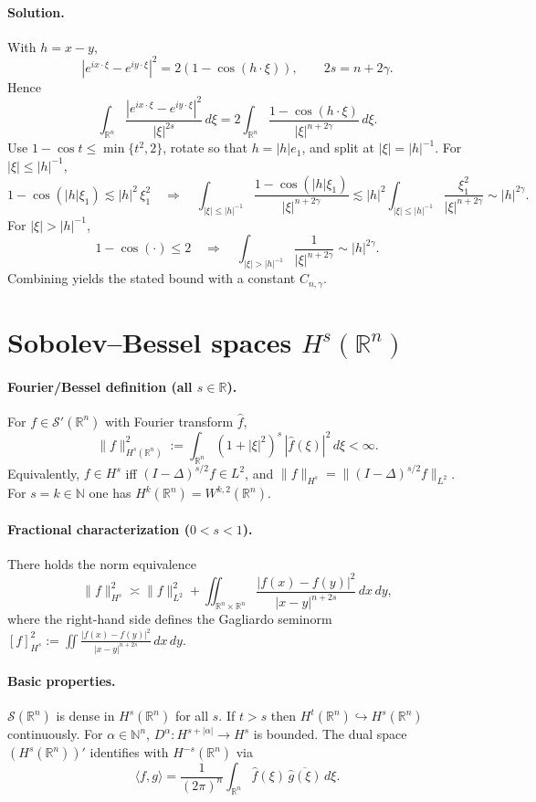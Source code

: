 \documentclass[12pt,a4paper]{article}
\theoremstyle{plain}
\theoremstyle{definition}
\theoremstyle{remark}
\theoremstyle{remark}
\begin{document}
\paragraph{Solution.}
With $h=x-y$,
\[
|e^{ix\cdot\xi}-e^{iy\cdot\xi}|^2=2(1-\cos(h\cdot\xi)),
\qquad
2s=n+2\gamma.
\]
Hence
\[
\int_{\mathbb R^n}\frac{|e^{ix\cdot\xi}-e^{iy\cdot\xi}|^2}{|\xi|^{2s}}\,d\xi
=2\!\int_{\mathbb R^n}\frac{1-\cos(h\cdot\xi)}{|\xi|^{n+2\gamma}}\,d\xi.
\]
Use $1-\cos t\le \min\{t^2,2\}$, rotate so that $h=|h|e_1$, and split at $|\xi|=|h|^{-1}$.
For $|\xi|\le |h|^{-1}$,
\[
1-\cos(|h|\xi_1)\lesssim |h|^2\,\xi_1^2
\quad\Rightarrow\quad
\int_{|\xi|\le |h|^{-1}}\frac{1-\cos(|h|\xi_1)}{|\xi|^{n+2\gamma}}
\lesssim |h|^2 \int_{|\xi|\le |h|^{-1}}\frac{\xi_1^2}{|\xi|^{n+2\gamma}}
\sim |h|^{2\gamma}.
\]
For $|\xi|>|h|^{-1}$,
\[
1-\cos(\cdot)\le 2
\quad\Rightarrow\quad
\int_{|\xi|>|h|^{-1}}\frac{1}{|\xi|^{n+2\gamma}}
\sim |h|^{2\gamma}.
\]
Combining yields the stated bound with a constant $C_{n,\gamma}$.

\section*{Sobolev--Bessel spaces $H^s(\mathbb R^n)$}

\paragraph{Fourier/Bessel definition (all $s\in\mathbb R$).}
For $f\in\mathcal S'(\mathbb R^n)$ with Fourier transform $\widehat f$,
\[
\|f\|_{H^s(\mathbb R^n)}^2 := \int_{\mathbb R^n} (1+|\xi|^2)^s\,|\widehat f(\xi)|^2\,d\xi < \infty.
\]
Equivalently, $f\in H^s$ iff $(I-\Delta)^{s/2}f\in L^2$, and
$\|f\|_{H^s}=\|(I-\Delta)^{s/2}f\|_{L^2}$.
For $s=k\in\mathbb N$ one has $H^k(\mathbb R^n)=W^{k,2}(\mathbb R^n)$.

\medskip

\paragraph{Fractional characterization ($0<s<1$).}
There holds the norm equivalence
\[
\|f\|_{H^s}^2 \asymp \|f\|_{L^2}^2
+ \iint_{\mathbb R^n\times\mathbb R^n} \frac{|f(x)-f(y)|^2}{|x-y|^{n+2s}}\,dx\,dy,
\]
where the right-hand side defines the Gagliardo seminorm
$[f]_{H^s}^2 := \iint \frac{|f(x)-f(y)|^2}{|x-y|^{n+2s}}\,dx\,dy$.

\medskip

\paragraph{Basic properties.}
$\mathcal S(\mathbb R^n)$ is dense in $H^s(\mathbb R^n)$ for all $s$.
If $t>s$ then $H^t(\mathbb R^n)\hookrightarrow H^s(\mathbb R^n)$ continuously.
For $\alpha\in\mathbb N^n$, $D^\alpha:H^{s+|\alpha|}\to H^s$ is bounded.
The dual space $(H^s(\mathbb R^n))'$ identifies with $H^{-s}(\mathbb R^n)$ via
\[
\langle f,g\rangle=\frac{1}{(2\pi)^n}\int_{\mathbb R^n}\widehat f(\xi)\,\overline{\widehat g(\xi)}\,d\xi.
\]
\end{document}
